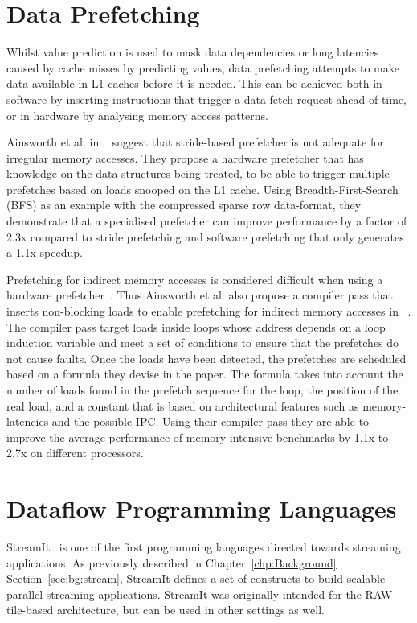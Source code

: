 \section{Data Prefetching}
Whilst value prediction is used to mask data dependencies or long latencies caused by cache misses by predicting values, data prefetching attempts to make data available in L1 caches before it is needed.
This can be achieved both in software by inserting instructions that trigger a data fetch-request ahead of time, or in hardware by analysing memory access patterns.

Ainsworth et al. in ~\cite{graphPrefetch2016} suggest that stride-based prefetcher is not adequate for irregular memory accesses.
They propose a hardware prefetcher that has knowledge on the data structures being treated, to be able to trigger multiple prefetches based on loads snooped on the L1 cache.
Using Breadth-First-Search (BFS) as an example with the compressed sparse row data-format, they demonstrate that a specialised prefetcher can improve performance by a factor of 2.3x compared to stride prefetching and software prefetching that only generates a 1.1x speedup.

Prefetching for indirect memory accesses is considered difficult when using a hardware prefetcher~\cite{lee2012whenprefetchworks,prefetchForIndirect2017}.
Thus Ainsworth et al. also propose a compiler pass that inserts non-blocking loads to enable prefetching for indirect memory accesses in ~\cite{prefetchForIndirect2017}.
The compiler pass target loads inside loops whose address depends on a loop induction variable and meet a set of conditions to ensure that the prefetches do not cause faults.
Once the loads have been detected, the prefetches are scheduled based on a formula they devise in the paper.
The formula takes into account the number of loads found in the prefetch sequence for the loop, the position of the real load, and a constant that is based on architectural features such as memory-latencies and the possible IPC.
Using their compiler pass they are able to improve the average performance of memory intensive benchmarks by 1.1x to 2.7x on different processors.

\section{Dataflow Programming Languages}

StreamIt~\cite{theis2002streamit} is one of the first programming languages directed towards streaming applications.
As previously described in Chapter~\ref{chp:Background} Section~\ref{sec:bg:stream}, StreamIt defines a set of constructs to build scalable parallel streaming applications.
StreamIt was originally intended for the RAW ~\cite{waingold1997raw} tile-based architecture, but can be used in other settings as well.

